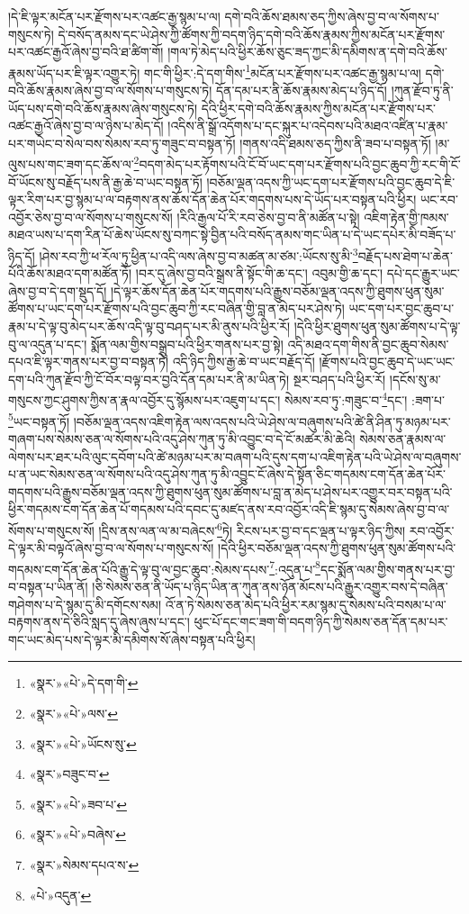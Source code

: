 །དེ་ཇི་ལྟར་མངོན་པར་རྫོགས་པར་འཚང་རྒྱ་སྙམ་པ་ལ། དགེ་བའི་ཆོས་ཐམས་ཅད་ཀྱིས་ཞེས་བྱ་བ་ལ་སོགས་པ་གསུངས་ཏེ། དེ་བསོད་ནམས་དང་ཡེ་ཤེས་ཀྱི་ཚོགས་ཀྱི་བདག་ཉིད་དགེ་བའི་ཆོས་རྣམས་ཀྱིས་མངོན་པར་རྫོགས་པར་འཚང་རྒྱའོ་ཞེས་བྱ་བའི་ཐ་ཚིག་གོ། །གལ་ཏེ་མེད་པའི་ཕྱིར་ཆོས་ཅུང་ཟད་ཀྱང་མི་དམིགས་ན་དགེ་བའི་ཆོས་རྣམས་ཡོད་པར་ཇི་ལྟར་འགྱུར་ཏེ། གང་གི་ཕྱིར་:དེ་དག་གིས་\footnote{«སྣར་»«པེ་»དེ་དག་གི་}མངོན་པར་རྫོགས་པར་འཚང་རྒྱ་སྙམ་པ་ལ། དགེ་བའི་ཆོས་རྣམས་ཞེས་བྱ་བ་ལ་སོགས་པ་གསུངས་ཏེ། དོན་དམ་པར་ནི་ཆོས་རྣམས་མེད་པ་ཉིད་དོ། །ཀུན་རྫོབ་ཏུ་ནི་ཡོད་པས་དགེ་བའི་ཆོས་རྣམས་ཞེས་གསུངས་ཏེ། དེའི་ཕྱིར་དགེ་བའི་ཆོས་རྣམས་ཀྱིས་མངོན་པར་རྫོགས་པར་འཚང་རྒྱའོ་ཞེས་བྱ་བ་ལ་ཉེས་པ་མེད་དོ། །འདིས་ནི་སྒྲོ་འདོགས་པ་དང་སྐུར་པ་འདེབས་པའི་མཐའ་འཛིན་པ་རྣམ་པར་གཡེང་བ་སེལ་བས་སེམས་རབ་ཏུ་གཟུང་བ་བསྟན་ཏོ། །གནས་འདི་ཐམས་ཅད་ཀྱིས་ནི་ཟབ་པ་བསྟན་ཏོ། །མ་ལུས་པས་གང་ཟག་དང་ཆོས་ལ་\footnote{«སྣར་»«པེ་»ལས་}བདག་མེད་པར་རྟོགས་པའི་ངོ་བོ་ཡང་དག་པར་རྫོགས་པའི་བྱང་ཆུབ་ཀྱི་རང་གི་ངོ་བོ་ཡོངས་སུ་བརྗོད་པས་ནི་རྒྱ་ཆེ་བ་ཡང་བསྟན་ཏོ། །བཅོམ་ལྡན་འདས་ཀྱི་ཡང་དག་པར་རྫོགས་པའི་བྱང་ཆུབ་དེ་ཇི་ལྟར་རིག་པར་བྱ་སྙམ་པ་ལ་བརྟགས་ནས་ཆོས་དོན་ཆེན་པོར་གདགས་པས་དེ་ཡོད་པར་བསྟན་པའི་ཕྱིར། ཡང་རབ་འབྱོར་ཅེས་བྱ་བ་ལ་སོགས་པ་གསུངས་སོ། །རིའི་རྒྱལ་པོ་རི་རབ་ཅེས་བྱ་བ་ནི་མཚོན་པ་སྟེ། འཇིག་རྟེན་གྱི་ཁམས་མཐའ་ཡས་པ་དག་རིན་པོ་ཆེས་ཡོངས་སུ་བཀང་སྟེ་བྱིན་པའི་བསོད་ནམས་གང་ཡིན་པ་དེ་ཡང་དཔེར་མི་བཟོད་པ་ཉིད་དོ། །ཤེས་རབ་ཀྱི་ཕ་རོལ་ཏུ་ཕྱིན་པ་འདི་ལས་ཞེས་བྱ་བ་མཚན་མ་ཙམ་:ཡོངས་སུ་མི་\footnote{«སྣར་»«པེ་»ཡོངས་སུ་}བརྗོད་པས་ཐེག་པ་ཆེན་པོའི་ཆོས་མཐའ་དག་མཚོན་ཏོ། །བར་དུ་ཞེས་བྱ་བའི་སྒྲས་ནི་སྟོང་གི་ཆ་དང་། འབུམ་གྱི་ཆ་དང་། དཔེ་དང་རྒྱུར་ཡང་ཞེས་བྱ་བ་དེ་དག་སྡུད་དོ། །དེ་ལྟར་ཆོས་དོན་ཆེན་པོར་གདགས་པའི་རྒྱུས་བཅོམ་ལྡན་འདས་ཀྱི་ཐུགས་ཕུན་སུམ་ཚོགས་པ་ཡང་དག་པར་རྫོགས་པའི་བྱང་ཆུབ་ཀྱི་རང་བཞིན་གྱི་བླ་ན་མེད་པར་ཤེས་ཏེ། ཡང་དག་པར་བྱང་ཆུབ་པ་རྣམ་པ་དེ་ལྟ་བུ་མེད་པར་ཆོས་འདི་ལྟ་བུ་བཤད་པར་མི་ནུས་པའི་ཕྱིར་རོ། །དེའི་ཕྱིར་ཐུགས་ཕུན་སུམ་ཚོགས་པ་དེ་ལྟ་བུ་ལ་འདུན་པ་དང་། སྨོན་ལམ་གྱིས་བསྒྲུབ་པའི་ཕྱིར་གནས་པར་བྱ་སྟེ། འདི་མཐའ་དག་གིས་ནི་བྱང་ཆུབ་སེམས་དཔའ་ཇི་ལྟར་གནས་པར་བྱ་བ་བསྟན་ཏེ། འདི་ཉིད་ཀྱིས་རྒྱ་ཆེ་བ་ཡང་བརྗོད་དོ། །རྫོགས་པའི་བྱང་ཆུབ་དེ་ཡང་ཡང་དག་པའི་ཀུན་རྫོབ་ཀྱི་ངོ་བོར་བལྟ་བར་བྱའི་དོན་དམ་པར་ནི་མ་ཡིན་ཏེ། སྔར་བཤད་པའི་ཕྱིར་རོ། །དངོས་སུ་མ་གསུངས་ཀྱང་ཤུགས་ཀྱིས་ན་རྣལ་འབྱོར་དུ་སྙོམས་པར་འཇུག་པ་དང་། སེམས་རབ་ཏུ་:གཟུང་བ་\footnote{«སྣར་»བཟུང་བ་}དང་། :ཟག་པ་\footnote{«སྣར་»«པེ་»ཟབ་པ་}ཡང་བསྟན་ཏོ། །བཅོམ་ལྡན་འདས་འཇིག་རྟེན་ལས་འདས་པའི་ཡེ་ཤེས་ལ་བཞུགས་པའི་ཚེ་ནི་ཤིན་ཏུ་མཉམ་པར་གཞག་པས་སེམས་ཅན་ལ་སོགས་པའི་འདུ་ཤེས་ཀུན་ཏུ་མི་འབྱུང་བ་དེ་ངོ་མཚར་མི་ཆེའི། སེམས་ཅན་རྣམས་ལ་ལེགས་པར་ཐར་པའི་ལུང་དབོག་པའི་ཚེ་མཉམ་པར་མ་བཞག་པའི་དུས་དག་པ་འཇིག་རྟེན་པའི་ཡེ་ཤེས་ལ་བཞུགས་པ་ན་ཡང་སེམས་ཅན་ལ་སོགས་པའི་འདུ་ཤེས་ཀུན་ཏུ་མི་འབྱུང་ངོ་ཞེས་དེ་སྟོན་ཅིང་གདམས་ངག་དོན་ཆེན་པོར་གདགས་པའི་རྒྱུས་བཅོམ་ལྡན་འདས་ཀྱི་ཐུགས་ཕུན་སུམ་ཚོགས་པ་བླ་ན་མེད་པ་ཤེས་པར་འགྱུར་བར་བསྟན་པའི་ཕྱིར་གདམས་ངག་དོན་ཆེན་པོ་གདམས་པའི་དབང་དུ་མཛད་ནས་རབ་འབྱོར་འདི་ཇི་སྙམ་དུ་སེམས་ཞེས་བྱ་བ་ལ་སོགས་པ་གསུངས་སོ། །དྲིས་ནས་ལན་ལ་མ་བཞེངས་\footnote{«སྣར་»«པེ་»བཞེས་}ཏེ། རིངས་པར་བྱ་བ་དང་ལྡན་པ་ལྟར་ཉིད་ཀྱིས། རབ་འབྱོར་དེ་ལྟར་མི་བལྟའོ་ཞེས་བྱ་བ་ལ་སོགས་པ་གསུངས་སོ། །དེའི་ཕྱིར་བཅོམ་ལྡན་འདས་ཀྱི་ཐུགས་ཕུན་སུམ་ཚོགས་པའི་གདམས་ངག་དོན་ཆེན་པོའི་རྒྱུ་དེ་ལྟ་བུ་ལ་བྱང་ཆུབ་:སེམས་དཔས་\footnote{«སྣར་»སེམས་དཔའ་ས་}:འདུན་པ་\footnote{«པེ་»འདུན་}དང་སྨོན་ལམ་གྱིས་གནས་པར་བྱ་བ་བསྟན་པ་ཡིན་ནོ། །ཅི་སེམས་ཅན་ནི་ཡོད་པ་ཉིད་ཡིན་ན་ཀུན་ནས་ཉོན་མོངས་པའི་རྒྱུར་འགྱུར་བས་དེ་བཞིན་གཤེགས་པ་དེ་སྙམ་དུ་མི་དགོངས་སམ། འོ་ན་ཏེ་སེམས་ཅན་མེད་པའི་ཕྱིར་རམ་སྙམ་དུ་སེམས་པའི་བསམ་པ་ལ་བརྟགས་ནས་དེ་ཅིའི་སླད་དུ་ཞེས་ཞུས་པ་དང་། ཕུང་པོ་དང་གང་ཟག་གི་བདག་ཉིད་ཀྱི་སེམས་ཅན་དོན་དམ་པར་གང་ཡང་མེད་པས་དེ་ལྟར་མི་དམིགས་སོ་ཞེས་བསྟན་པའི་ཕྱིར། 